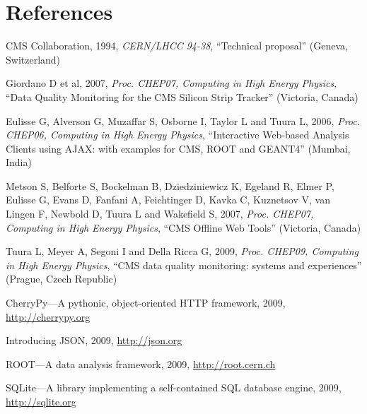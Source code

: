 \documentclass[a4paper]{jpconf}
\begin{document}
\section*{References}
\begin{thebibliography}{9}

  CMS Collaboration,
  1994, {\it CERN/LHCC 94-38},
  ``Technical proposal''
  (Geneva, Switzerland)

  Giordano D et al,
  2007, {\it Proc. CHEP07, Computing in High Energy Physics},
  ``Data Quality Monitoring for the CMS Silicon Strip Tracker''
  (Victoria, Canada)

  Eulisse G, Alverson G, Muzaffar S, Osborne I, Taylor L and Tuura L,
  2006, {\it Proc. CHEP06, Computing in High Energy Physics},
  ``Interactive Web-based Analysis Clients using AJAX: with examples
  for CMS, ROOT and GEANT4''
  (Mumbai, India)

  Metson S, Belforte S, Bockelman B, Dziedziniewicz K, Egeland R,
  Elmer P, Eulisse G, Evans D, Fanfani A, Feichtinger D, Kavka C,
  Kuznetsov V, van Lingen F, Newbold D, Tuura L and Wakefield S,
  2007, {\it Proc. CHEP07, Computing in High Energy Physics},
  ``CMS Offline Web Tools''
  (Victoria, Canada)

  Tuura L, Meyer A, Segoni I and Della Ricca G,
  2009, {\it Proc. CHEP09, Computing in High Energy Physics},
  ``CMS data quality monitoring: systems and experiences''
  (Prague, Czech Republic)

  CherryPy---A pythonic, object-oriented HTTP framework, 2009,
  \url{http://cherrypy.org}

  Introducing JSON, 2009, \url{http://json.org}

  ROOT---A data analysis framework, 2009, \url{http://root.cern.ch}

  SQLite---A library implementing a self-contained SQL database engine,
  2009, \url{http://sqlite.org}

\end{thebibliography}
\end{document}
